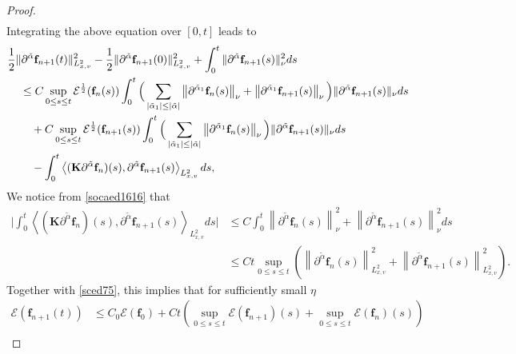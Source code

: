 \documentclass[reqno]{amsart}
\numberwithin{equation}{section}
\numberwithin{equation}{section}
\begin{document}
\begin{proof}
\begin{align}
		\end{align}
		Integrating the above equation over $[0, t]$ leads to
		\begin{align}
			&\frac{1}{2}\|\partial^{\tilde{\alpha}} \mathbf{f}_{n+1}(t)\|^2_{L^{2}_{x,v}} - \frac{1}{2}\|\partial^{\tilde{\alpha}} \mathbf{f}_{n+1}(0)\|^2_{L^{2}_{x,v}} + \int_0^t \|\partial^{\tilde{\alpha}} \mathbf{f}_{n+1}(s)\|^2_{\nu} ds \notag\\
			&\hspace{0.4cm}\leq C \sup_{0 \leq s \leq t} \mathcal{E}^{\frac{1}{2}}(\mathbf{f}_{n}(s)) \int_0^t \Big( \sum_{| \tilde{\alpha}_1 | \leq | \tilde{\alpha} |} \left\|  \partial^{\tilde{\alpha}_1} \mathbf{f}_{n}(s)\right\|_{\nu} + \left\|  \partial^{\tilde{\alpha}_1} \mathbf{f}_{n+1}(s)\right\|_{\nu} \Big) \|\partial^{\tilde{\alpha}} \mathbf{f}_{n+1}(s)\|_{\nu} ds \notag\\
			&\hspace{0.4cm}\quad + C \sup_{0 \leq s \leq t} \mathcal{E}^{\frac{1}{2}}(\mathbf{f}_{n+1}(s)) \int_0^t \Big( \sum_{| \tilde{\alpha}_1 | \leq | \tilde{\alpha} |} \left\|  \partial^{\tilde{\alpha}_1} \mathbf{f}_{n}(s)\right\|_{\nu}\Big) \|\partial^{\tilde{\alpha}} \mathbf{f}_{n+1}(s)\|_{\nu} ds \notag\\
			&\hspace{0.4cm}\quad - \int_0^t \left\langle  (\mathbf{K}\partial^{\tilde{\alpha}} \mathbf{f}_n)(s) , \partial^{\tilde{\alpha}} \mathbf{f}_{n+1}(s) \right\rangle_{L^{2}_{x,v}}ds,\label{scad7777}
		\end{align}
		We notice  from \eqref{socaed1616} that
		\[
		\begin{aligned}
			\Big|\int_0^t \left\langle  (\mathbf{K}\partial^{\tilde{\alpha}} \mathbf{f}_n)(s) , \partial^{\tilde{\alpha}} \mathbf{f}_{n+1}(s) \right\rangle_{L^{2}_{x,v}}ds\Big| &\leq C \int_0^t  \left\|  \partial^{\tilde{\alpha}} \mathbf{f}_{n}(s)\right\|^2_{\nu} + \left\|  \partial^{\tilde{\alpha}} \mathbf{f}_{n+1}(s)\right\|^2_{\nu} ds \\
			&\leq C t \sup_{0 \leq s \leq t} \left( \left\|  \partial^{\tilde{\alpha}} \mathbf{f}_{n}(s)\right\|^2_{L^{2}_{x,v}} + \left\|  \partial^{\tilde{\alpha}} \mathbf{f}_{n+1}(s)\right\|^2_{L^{2}_{x,v}} \right).
		\end{aligned}
		\]
		Together with \eqref{sced75}, this implies that for sufficiently small $\eta$
		\begin{align*}
			\mathcal{E}(\mathbf{f}_{n+1}(t)) &\leq C_0\mathcal{E}(\mathbf{f}_0) + Ct \left( \sup_{0 \leq s \leq t} \mathcal{E}(\mathbf{f}_{n+1})(s) + \sup_{0 \leq s \leq t} \mathcal{E}(\mathbf{f}_n)(s) \right)  \\

\end{align*}
\end{proof}
\end{document}
